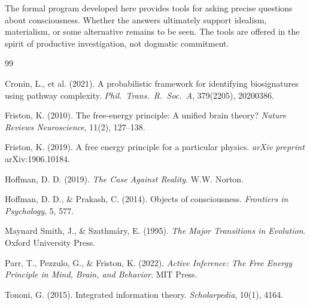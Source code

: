 \documentclass[11pt,a4paper]{article}
\theoremstyle{definition}
\theoremstyle{plain}
\theoremstyle{remark}
\begin{document}
The formal program developed here provides tools for asking precise questions about consciousness. Whether the answers ultimately support idealism, materialism, or some alternative remains to be seen. The tools are offered in the spirit of productive investigation, not dogmatic commitment.

\begin{thebibliography}{99}

 Cronin, L., et al. (2021). A probabilistic framework for identifying biosignatures using pathway complexity. \textit{Phil.\ Trans.\ R.\ Soc.\ A}, 379(2205), 20200386.

 Friston, K. (2010). The free-energy principle: A unified brain theory? \textit{Nature Reviews Neuroscience}, 11(2), 127--138.

 Friston, K. (2019). A free energy principle for a particular physics. \textit{arXiv preprint} arXiv:1906.10184.

 Hoffman, D. D. (2019). \textit{The Case Against Reality}. W.W. Norton.

 Hoffman, D. D., \& Prakash, C. (2014). Objects of consciousness. \textit{Frontiers in Psychology}, 5, 577.

 Maynard Smith, J., \& Szathm\'ary, E. (1995). \textit{The Major Transitions in Evolution}. Oxford University Press.

 Parr, T., Pezzulo, G., \& Friston, K. (2022). \textit{Active Inference: The Free Energy Principle in Mind, Brain, and Behavior}. MIT Press.

 Tononi, G. (2015). Integrated information theory. \textit{Scholarpedia}, 10(1), 4164.

\end{thebibliography}
\end{document}
